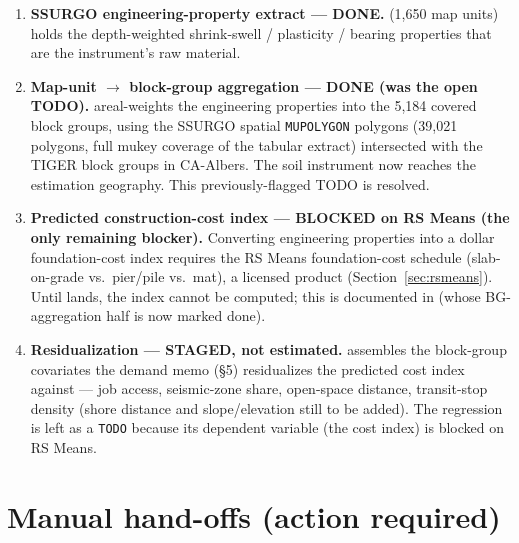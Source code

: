 \documentclass[11pt]{article}
\newcommand{\NMAPUNITS}{1,650}        %
\newcommand{\NSOILPOLY}{39,021}           %
\newcommand{\NSOILBG}{5,184}             %
\begin{document}
\begin{enumerate}[leftmargin=2em]
\item \textbf{SSURGO engineering-property extract --- DONE.}
   (\NMAPUNITS{} map units)
  holds the depth-weighted shrink-swell / plasticity / bearing properties that
  are the instrument's raw material.
\item \textbf{Map-unit $\to$ block-group aggregation --- DONE (was the open TODO).}
   areal-weights the engineering properties
  into the \NSOILBG{} covered block groups, using the SSURGO spatial
  \texttt{MUPOLYGON} polygons (\NSOILPOLY{} polygons, full mukey coverage of the
  tabular extract) intersected with the TIGER block groups in CA-Albers. The soil
  instrument now reaches the estimation geography. This previously-flagged TODO
  is resolved.
\item \textbf{Predicted construction-cost index --- BLOCKED on RS Means
  (the only remaining blocker).}
  Converting engineering properties into a dollar foundation-cost index requires
  the RS Means foundation-cost schedule (slab-on-grade vs.\ pier/pile vs.\ mat),
  a licensed product (Section~\ref{sec:rsmeans}). Until
   lands, the index cannot be computed; this
  is documented in 
  (whose BG-aggregation half is now marked done).
\item \textbf{Residualization --- STAGED, not estimated.}
   assembles the block-group covariates
  the demand memo (\S5) residualizes the predicted cost index against --- job
  access, seismic-zone share, open-space distance, transit-stop density (shore
  distance and slope/elevation still to be added). The regression is left as a
  \texttt{TODO} because its dependent variable (the cost index) is blocked on
  RS Means.
\end{enumerate}

\section{Manual hand-offs (action required)}\label{sec:manual}
\end{document}
